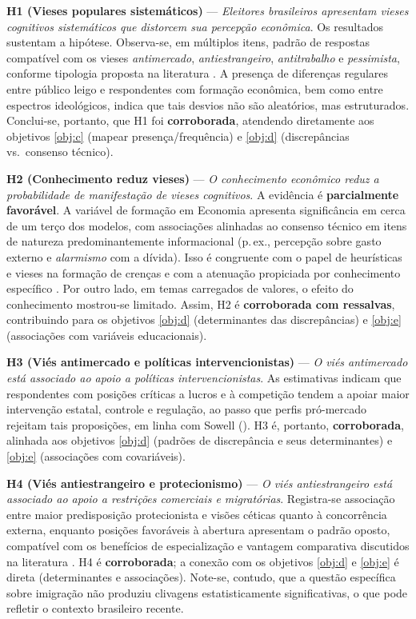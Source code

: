 \textbf{H1 (Vieses populares sistemáticos)} — \textit{Eleitores brasileiros apresentam vieses cognitivos sistemáticos que distorcem sua percepção econômica}. Os resultados sustentam a hipótese. Observa-se, em múltiplos itens, padrão de respostas compatível com os vieses \emph{antimercado}, \emph{antiestrangeiro}, \emph{antitrabalho} e \emph{pessimista}, conforme tipologia proposta na literatura \cite{The_Myth_of_the_Rational_Voter}. A presença de diferenças regulares entre público leigo e respondentes com formação econômica, bem como entre espectros ideológicos, indica que tais desvios não são aleatórios, mas estruturados. Conclui-se, portanto, que H1 foi \textbf{corroborada}, atendendo diretamente aos objetivos \autoref{obj:c} (mapear presença/frequência) e \autoref{obj:d} (discrepâncias vs.\ consenso técnico).

\textbf{H2 (Conhecimento reduz vieses)} — \textit{O conhecimento econômico reduz a probabilidade de manifestação de vieses cognitivos}. A evidência é \textbf{parcialmente favorável}. A variável de formação em Economia apresenta significância em cerca de um terço dos modelos, com associações alinhadas ao consenso técnico em itens de natureza predominantemente informacional (p.\,ex., percepção sobre gasto externo e \emph{alarmismo} com a dívida). Isso é congruente com o papel de heurísticas e vieses na formação de crenças e com a atenuação propiciada por conhecimento específico \cite{kahneman2011thinking,Judgment_under_Uncertainty, The_Myth_of_the_Rational_Voter}. Por outro lado, em temas carregados de valores, o efeito do conhecimento mostrou-se limitado. Assim, H2 é \textbf{corroborada com ressalvas}, contribuindo para os objetivos \autoref{obj:d} (determinantes das discrepâncias) e \autoref{obj:e} (associações com variáveis educacionais).

\textbf{H3 (Viés antimercado e políticas intervencionistas)} — \textit{O viés antimercado está associado ao apoio a políticas intervencionistas}. As estimativas indicam que respondentes com posições críticas a lucros e à competição tendem a apoiar maior intervenção estatal, controle e regulação, ao passo que perfis pró-mercado rejeitam tais proposições, em linha com Sowell (\citeyear{sowell2000basic,sowell2004applied,sowell2007conflict}). H3 é, portanto, \textbf{corroborada}, alinhada aos objetivos \autoref{obj:d} (padrões de discrepância e seus determinantes) e \autoref{obj:e} (associações com covariáveis).

\textbf{H4 (Viés antiestrangeiro e protecionismo)} — \textit{O viés antiestrangeiro está associado ao apoio a restrições comerciais e migratórias}. Registra-se associação entre maior predisposição protecionista e visões céticas quanto à concorrência externa, enquanto posições favoráveis à abertura apresentam o padrão oposto, compatível com os benefícios de especialização e vantagem comparativa discutidos na literatura \cite{bhagwati2003free, The_Myth_of_the_Rational_Voter}. H4 é \textbf{corroborada}; a conexão com os objetivos \autoref{obj:d} e \autoref{obj:e} é direta (determinantes e associações). Note-se, contudo, que a questão específica sobre imigração não produziu clivagens estatisticamente significativas, o que pode refletir o contexto brasileiro recente.

